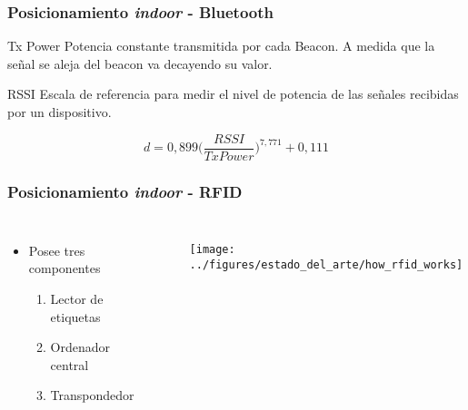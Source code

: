 \documentclass[mathserif]{beamer}
\begin{document}
\begin{frame}
\frametitle{Posicionamiento \textit{indoor} - Bluetooth}

\begin{block}{Tx Power}
Potencia constante transmitida por cada Beacon. A medida que la señal se aleja del beacon va decayendo su valor.
\end{block}

\begin{block}{RSSI}
Escala de referencia para medir el nivel de potencia de las señales recibidas por un dispositivo.  
\end{block}



\begin{equation*}
d = 0,899\Bigg(\frac{RSSI}{TxPower}\Bigg)^{7,771}+0,111
\end{equation*}



\end{frame}


\begin{frame}
\frametitle{Posicionamiento \textit{indoor} - RFID}

\begin{columns}[c]


\begin{itemize}

\item Posee tres componentes
\begin{enumerate}[1]
\item Lector de etiquetas
\item Ordenador central
\item Transpondedor
\end{enumerate}


\end{itemize}

 



\begin{figure}
\texttt{[image: ../figures/estado\_del\_arte/how\_rfid\_works]}
\end{figure}

\end{columns}


\end{frame}
\end{document}
